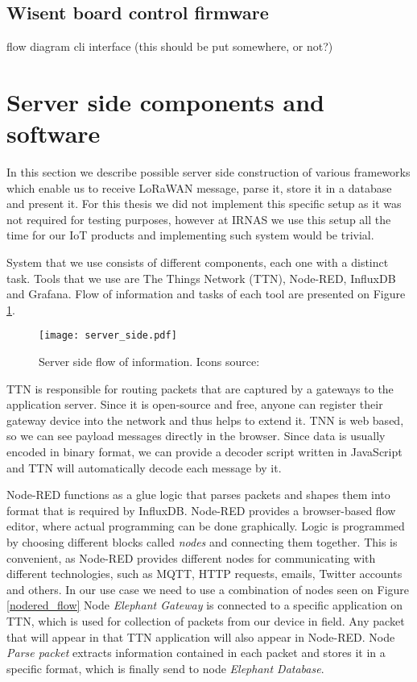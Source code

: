 \subsection{ Wisent board control firmware}
    flow diagram
    cli interface (this should be put somewhere, or not?)

\section{ Server side components and software}

In this section we describe possible server side construction of various frameworks which enable us to receive LoRaWAN message, parse it, store it in a database and present it.
For this thesis we did not implement this specific setup as it was not required for testing purposes, however at IRNAS we use this setup all the time for our IoT products and implementing such system would be trivial.

System that we use consists of different components, each one with a distinct task.
Tools that we use are The Things Network (TTN), Node-RED, InfluxDB and Grafana.
Flow of information and tasks of each tool are presented on Figure \ref{server_side}.

\begin{figure}[ht]
    \centering
    \texttt{[image: server\_side.pdf]} 
    \caption{ Server side flow of information. Icons source:\cite{icons}}
    \label{server_side}
\end{figure}

TTN is responsible for routing packets that are captured by a gateways to the application server.
Since it is open-source and free, anyone can register their gateway device into the network and thus helps to extend it.
TNN is web based, so we can see payload messages directly in the browser.
Since data is usually encoded in binary format, we can provide a decoder script written in JavaScript and TTN will automatically decode each message by it.

Node-RED functions as a glue logic that parses packets and shapes them into format that is required by InfluxDB.
Node-RED provides a browser-based flow editor, where actual programming can be done graphically.
Logic is programmed by choosing different blocks called \textit{nodes} and connecting them together.
This is convenient, as Node-RED provides different nodes for communicating with different technologies, such as MQTT, HTTP requests, emails, Twitter accounts and others.
In our use case we need to use a combination of nodes seen on Figure \ref{nodered_flow}
Node \textit{Elephant Gateway} is connected to a specific application on TTN, which is used for collection of packets from our device in field.
Any packet that will appear in that TTN application will also appear in Node-RED.
Node \textit{Parse packet} extracts information contained in each packet and stores it in a specific format, which is finally send to node \textit{Elephant Database}.

